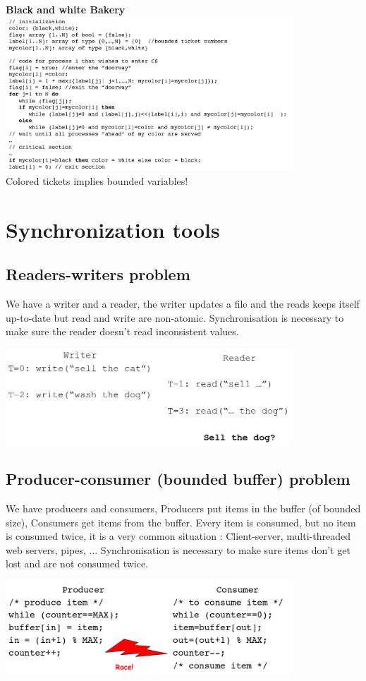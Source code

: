 \documentclass{article}
\theoremstyle{definition}
\begin{document}
\begin{center}
	\large{\textbf{Black and white Bakery}}\\
	\includegraphics[width=0.8\textwidth]{bw_bakery}\\
	Colored tickets implies bounded variables!
\end{center}

\section{Synchronization tools}

\subsection{Readers-writers problem}
We have a writer and a reader, the writer updates a file and the reads keeps itself up-to-date but read and write are non-atomic. Synchronisation is necessary to make sure the reader doesn't read inconsistent values.
\begin{center}
	\includegraphics[width=0.8\textwidth]{read_writer_pb}
\end{center}

\subsection{Producer-consumer (bounded buffer) problem}

We have producers and consumers, Producers put items in the buffer (of bounded size), Consumers get items from the buffer. Every item is consumed, but no item is consumed twice, it is a very common situation : Client-server, multi-threaded web servers, pipes, ... Synchronisation is necessary to make sure items don't get lost and are not consumed twice.
\begin{center}
	\includegraphics[width=0.8\textwidth]{producer_consumer_pb}
\end{center}
\end{document}
